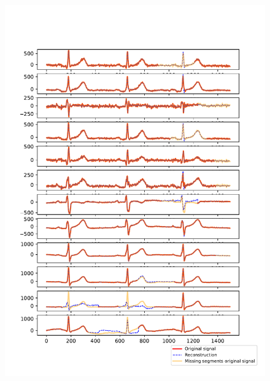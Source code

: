 \documentclass{mldsmsc}
\begin{document}
\begin{figure}[h!]
\centering
\begin{minipage}{0.4\linewidth}
    \centering
    \includegraphics[width=\linewidth]{images/missing/psmf_output_20_10_half.pdf}
    \label{fig:limp}
\end{minipage}%
\hspace{0.05\linewidth}
\begin{minipage}{0.4\linewidth}
    \centering

\end{minipage}
\end{figure}
\end{document}

